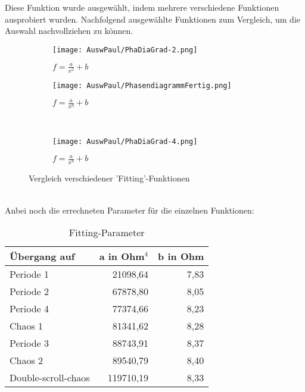 Diese Funktion wurde ausgewählt, indem mehrere verschiedene Funktionen ausprobiert wurden. Nachfolgend ausgewählte Funktionen zum Vergleich, um die Auswahl nachvollziehen zu können.
\begin{figure}[h]

    \centering
    
    \begin{subfigure}[b]{0.45\textwidth}
        \centering
        \texttt{[image: AuswPaul/PhaDiaGrad-2.png]}
        \caption{$f = \frac{a}{x^2} + b$}
    \end{subfigure}
    \hfill
    \begin{subfigure}[b]{0.45\textwidth}
        \centering
        \texttt{[image: AuswPaul/PhasendiagrammFertig.png]}
        \caption{$f = \frac{a}{x^3} + b$}
    \end{subfigure}
    \\
    \begin{subfigure}[b]{0.45\textwidth}
        \centering
        \texttt{[image: AuswPaul/PhaDiaGrad-4.png]}
        \caption{$f = \frac{a}{x^4} + b$}
    \end{subfigure}
    \caption{Vergleich verschiedener 'Fitting'-Funktionen}
    \label{fig:PhasenDiaVergl}
    \end{figure}\\
\newpage
Anbei noch die errechneten Parameter für die einzelnen Funktionen: \\
\begin{table}[h]
    \centering
    \begin{tabular}{l|r|r}
            Übergang auf &     a in Ohm$^4$ & b in Ohm\\
            \hline
               Periode 1 &   21098,64 &  7,83 \\
               Periode 2 &   67878,80 &  8,05 \\
               Periode 4 &   77374,66 &  8,23 \\
                 Chaos 1 &   81341,62 &  8,28 \\
               Periode 3 &   88743,91 &  8,37 \\
                 Chaos 2 &   89540,79 &  8,40 \\
     Double-scroll-chaos &  119710,19 &  8,33 \\
    \end{tabular}
    \caption{Fitting-Parameter}
\end{table}




